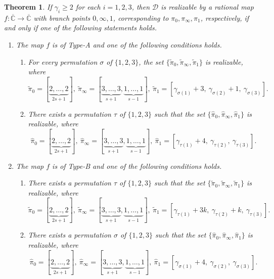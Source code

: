 \documentclass[microtype]{gtpart}     %
\newtheorem{thm}{Theorem}[section]    %
\theoremstyle{definition}
\begin{document}
\begin{thm}\label{MThm2}
If \(\gamma_i \ge 2\) for each \(i=1,2,3\), then \(\mathcal D\) is realizable by a rational map \(f:\overline{\mathbb{C}}\to \overline{\mathbb{C}}\) with branch points \(0,\infty,1\), corresponding to \(\pi_0,\pi_\infty,\pi_1\), respectively, if and only if one of the following statements holds.

\begin{enumerate}
\item[(A)] The map \(f\) is of Type-A and one of the following conditions holds.
\begin{enumerate}
\item[(A-1)] For every permutation \(\sigma\) of \(\{1,2,3\}\), the set \(\{\widetilde{\pi}_0,\widetilde{\pi}_\infty,\widetilde{\pi}_1\}\) is realizable, where
\[
\widetilde{\pi}_0=[\underbrace{2,\ldots,2}_{2s+1}],~
\widetilde{\pi}_\infty=[\underbrace{3,\ldots,3}_{s+1},\underbrace{1,\ldots,1}_{s-1}],~
\widetilde{\pi}_1=[\gamma_{\sigma(1)}+3,\ \gamma_{\sigma(2)}+1,\ \gamma_{\sigma(3)}].
\]
\item[(A-2)] There exists a permutation \(\tau\) of \(\{1,2,3\}\) such that the set \(\{\widehat{\pi}_0,\widehat{\pi}_\infty,\widehat{\pi}_1\}\) is realizable, where
\[
\widehat{\pi}_0=[\underbrace{2,\ldots,2}_{2s+1}],~
\widehat{\pi}_\infty=[\underbrace{3,\ldots,3}_{s+1},\underbrace{1,\ldots,1}_{s-1}],~
\widehat{\pi}_1=[\gamma_{\tau(1)}+4,\ \gamma_{\tau(2)},\ \gamma_{\tau(3)}].
\]
\end{enumerate}

\item[(B)] The map \(f\) is of Type-B and one of the following conditions holds.
\begin{enumerate}
\item[(B-1)] There exists a permutation \(\tau\) of \(\{1,2,3\}\) such that the set \(\{\widetilde{\pi}_0,\widetilde{\pi}_\infty,\widetilde{\pi}_1\}\) is realizable, where
\[
\widetilde{\pi}_0=[\underbrace{2,\ldots,2}_{2s+1}],~
\widetilde{\pi}_\infty=[\underbrace{3,\ldots,3}_{s+1},\underbrace{1,\ldots,1}_{s-1}],~
\widetilde{\pi}_1=[\gamma_{\tau(1)}+3k,\ \gamma_{\tau(2)}+k,\ \gamma_{\tau(3)}].
\]
\item[(B-2)] There exists a permutation \(\sigma\) of \(\{1,2,3\}\) such that the set \(\{\widehat{\pi}_0,\widehat{\pi}_\infty,\widehat{\pi}_1\}\) is realizable, where
\[
\widehat{\pi}_0=[\underbrace{2,\ldots,2}_{2s+1}],~
\widehat{\pi}_\infty=[\underbrace{3,\ldots,3}_{s+1},\underbrace{1,\ldots,1}_{s-1}],~
\widehat{\pi}_1=[\gamma_{\sigma(1)}+4,\ \gamma_{\sigma(2)},\ \gamma_{\sigma(3)}].
\]
\end{enumerate}
\end{enumerate}
\end{thm}
\end{document}
